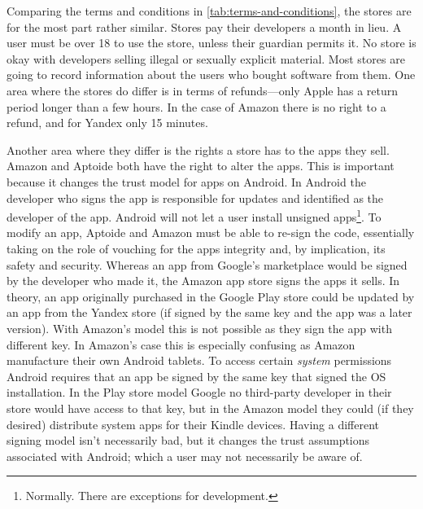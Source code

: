 \documentclass[thesis.tex]{subfiles}
\begin{document}
Comparing the terms and conditions in
\autoref{tab:terms-and-conditions}, the stores are for the most part
rather similar.  Stores pay their developers a month in lieu.  A user
must be over 18 to use the store, unless their guardian permits it.
No store is okay with developers selling illegal or sexually explicit
material.  Most stores are going to record information about the
users who bought software from them.  One area where the stores do
differ is in terms of refunds---only Apple has a return period longer
than a few hours.  In the case of Amazon there is no right to a
refund, and for Yandex only 15 minutes.

Another area where they differ is the rights a store has to the apps
they sell.  Amazon and Aptoide both have the right to alter the apps.
This is important because it changes the trust model for apps on
Android.  In Android the developer who signs the app is responsible
for updates and identified as the developer of the app. Android will
not let a user install unsigned apps\footnote{Normally. There are
exceptions for development.}.  To modify an app, Aptoide and Amazon
must be able to re-sign the code, essentially taking on the role of vouching for the apps integrity and, by implication, its safety and security.  Whereas an app from Google's
marketplace would be signed by the developer who made it, the Amazon
app store signs the apps it sells.  In theory, an app originally
purchased in the Google Play store could be updated by an app from the
Yandex store (if signed by the same key and the app was a later
version).  With Amazon's model this is not possible as they sign the
app with different key.  In Amazon's case this is especially confusing
as Amazon manufacture their own Android tablets.  To access certain
\emph{system} permissions Android requires that an app be signed by
the same key that signed the OS installation.  In the Play store model
Google no third-party developer in their store would have access to
that key, but in the Amazon model they could (if they desired)
distribute system apps for their Kindle devices.  Having a different
signing model isn't necessarily bad, but it changes the trust
assumptions associated with Android; which a user may not necessarily
be aware of.

\end{document}
